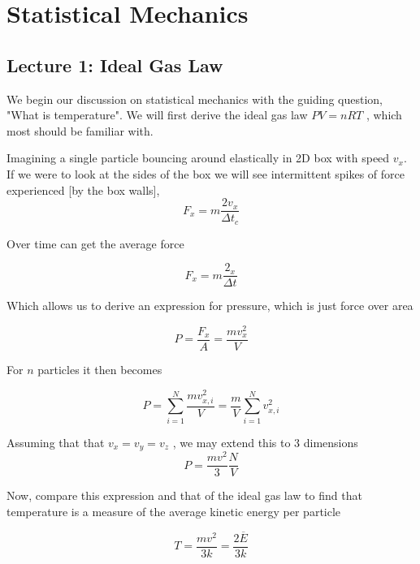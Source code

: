 \documentclass[10pt]{article}
\begin{document}
\section{Statistical Mechanics}

\subsection{Lecture 1: Ideal Gas Law}

We begin our discussion on statistical mechanics with the guiding question, "What is temperature".
We will first derive the ideal gas law $ PV=nRT $  , which most should be familiar with.

Imagining a single particle bouncing around elastically in 2D box with speed  $v_x$. 
If we were to look at the sides of the box we will see intermittent spikes of force experienced [by the box walls],
\begin{equation}
	F_x = m \frac{2v_x}{\Delta t_c}
\end{equation}

Over time can get the average force

\begin{equation}
	F_x = m \frac{2_x}{\Delta t}
\end{equation}

Which allows us to derive an expression for pressure, which is just force over area

\begin{equation}
	P = \frac{F_x}{A} = \frac{mv_x^2}{V}
\end{equation}

For $n$ particles it then becomes

\begin{equation}
	P = \sum^N_{i = 1} \frac{mv_{x,i}^2}{V} = \frac{m}{V} \sum^N_{i = 1} v_{x,i}^2
\end{equation}

Assuming that that $ v_x = v_y = v_z$ , we may extend this to 3 dimensions
\begin{equation}
	P = \frac{mv^2}{3} \frac{N}{V}
\end{equation}

Now, compare this expression and that of the ideal gas law to find that temperature is a measure of the average kinetic energy per particle

\begin{equation}
	T = \frac{mv^2}{3k} = \frac{2\overline{E}}{3k}
	\label{eq:294:temp_dfn}
\end{equation}
\end{document}
